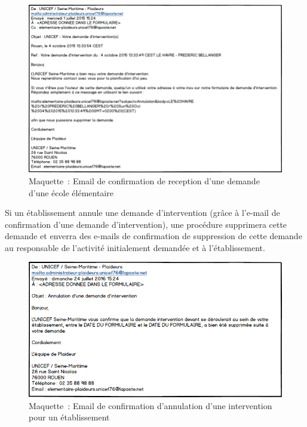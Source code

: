 \begin{figure}[H]
	\centering
	\includegraphics[scale=0.615]{images/maquettes/fonctionnalite4MailConfirmationReceptionDemande.png}
	\caption{Maquette~: Email de confirmation de reception d'une demande d'une école élémentaire}
\end{figure}

Si un établissement annule une demande d'intervention (grâce à l'e-mail de confirmation d'une demande d'intervention), une procédure supprimera cette demande et enverra des e-mails de confirmation de suppression de cette demande au responsable de l'activité initialement demandée et à l'établissement.
  


\begin{figure}[H]
	\centering
	\includegraphics[scale=0.7]{images/maquettes/fonctionnalite4MailConfirmationSuppressionDemandePourEtablissement.png}
	\caption{Maquette~: Email de confirmation d'annulation d'une intervention pour un établissement}
\end{figure}

